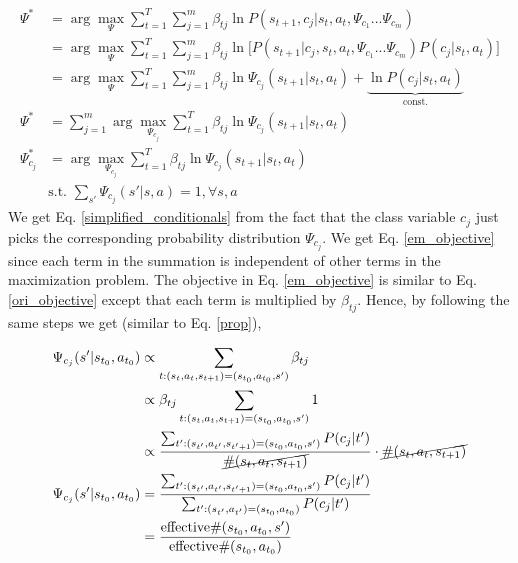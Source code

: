 \documentclass{article}[11pt]
\begin{document}
 
\begin{align}
\Psi^* &= \arg \max_{\Psi} \sum_{t=1}^T\sum_{j=1}^m \beta_{tj} \ln P(s_{t+1}, c_j|s_t,a_t,\Psi_{c_1} ... \Psi_{c_m})\\
 &= \arg \max_{\Psi} \sum_{t=1}^T\sum_{j=1}^m \beta_{tj} \ln \big[P(s_{t+1}|c_j, s_t,a_t,\Psi_{c_1} ... \Psi_{c_m})P(c_j|s_t,a_t)\big]\\
 \label{simplified_conditionals}
  &= \arg \max_{\Psi} \sum_{t=1}^T\sum_{j=1}^m \beta_{tj} \ln \Psi_{c_j}(s_{t+1}| s_t,a_t) + \underbrace{\ln P(c_j|s_t,a_t)}_{\text{const.}}\\
  \label{em_objective_full}
   \Psi^*   &=  \sum_{j=1}^m \arg \max_{\Psi_{c_j}}\sum_{t=1}^T\beta_{tj} \ln \Psi_{c_j}(s_{t+1}| s_t,a_t) \\
  \label{em_objective}
 \Psi^*_{c_j}   &=  \arg \max_{\Psi_{c_j}}\sum_{t=1}^T\beta_{tj} \ln \Psi_{c_j}(s_{t+1}| s_t,a_t) \\
 &\text{s.t. } \sum_{s'} \Psi_{c_j}(s'|s,a) = 1, \forall s,a
\end{align} We get Eq. \ref{simplified_conditionals} from the fact that the class variable $c_j$ just picks the corresponding probability distribution $\Psi_{c_j}$. We get Eq. \ref{em_objective} since each term in the summation is independent of other terms in the maximization problem. The objective in Eq. \ref{em_objective} is similar to Eq. \ref{ori_objective} except that each term is multiplied by $\beta_{tj}$. Hence, by following the same steps we get (similar to Eq. \ref{prop}), 

\begin{align}
\Psi_{c_j}(s'|s_{t_0}, a_{t_0}) &\propto \sum_{t:(s_{t},a_{t},s_{t+1}) = (s_{t_0},a_{t_0},s')}\beta_{tj}\\
& \propto \beta_{tj} \sum_{t:(s_{t},a_{t},s_{t+1}) = (s_{t_0},a_{t_0},s')} 1\\
& \propto \frac{\sum_{t':(s_{t'},a_{t'},s_{t'+1}) = (s_{t_0},a_{t_0},s')}P(c_j|t')}{\cancel{\#(s_t,a_t,s_{t+1})}} \cdot \cancel{\#(s_t,a_t,s_{t+1})}\\
\Psi_{c_j}(s'|s_{t_0}, a_{t_0}) &= \frac{\sum_{t':(s_{t'},a_{t'},s_{t'+1}) = (s_{t_0},a_{t_0},s')}P(c_j|t')}{\sum_{t':(s_{t'},a_{t'}) = (s_{t_0}, a_{t_0})}P(c_j|t')}\\
&= \frac{\text{effective}\#(s_{t_0},a_{t_0},s')}{\text{effective}\#(s_{t_0},a_{t_0})}
\end{align}
 
\end{document}
